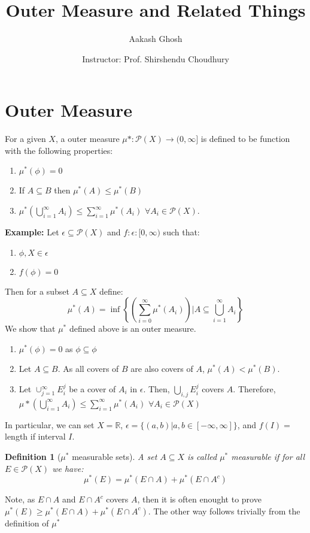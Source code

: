 \documentclass[oneside]{article}
\title{Outer Measure and Related Things}
\author{Aakash Ghosh }
\date{Instructor: Prof. Shirshendu Choudhury}
\newtheorem{definition}[theorem]{Definition}
\begin{document}
\maketitle





\section{Outer Measure}
For a given $X$, a outer measure $\mu *: \mathcal{P}(X)\to(0,\infty]$ is defined to be function with the following properties:
\begin{enumerate}
    \item $\mu^* (\phi)=0$
    \item If $A\subseteq B$ then $\mu^*(A)\leq \mu^*(B)$
    \item $\mu^*\left(\bigcup_{i=1}^\infty A_i\right)\leq \sum_{i=1}^\infty \mu^*(A_i)$ $\forall A_i\in\mathcal{P}(X)$.
\end{enumerate}

\textbf{Example:} Let $\epsilon\subseteq\mathcal P(X)$ and $f:\epsilon:[0,\infty)$ such that:
\begin{enumerate}
    \item $\phi,X\in \epsilon$
    \item $f(\phi)=0$
\end{enumerate}
Then for a subset $A\subseteq X$ define: 
$$\mu^*(A)=\inf\left\{\left(\sum_{i=0}^\infty\mu^*(A_i)\right)|A\subseteq \bigcup_{i=1}^\infty A_i\right\}$$
We show that $\mu^*$ defined above is an outer measure.
\begin{enumerate}
    \item $\mu^*(\phi)=0$ as $\phi\subseteq\phi$
    \item Let $A\subseteq B$. As all covers of $B$ are also covers of $A$, $\mu^*(A)<\mu^*(B)$.
    \item Let $\cup_{j=1}^\infty E_i^j$ be a cover of $A_i$ in $\epsilon$. Then, $\bigcup_{i,j}E_i^j$ covers $A$. Therefore,  $\mu *\left(\bigcup_{i=1}^\infty A_i\right)\leq \sum_{i=1}^\infty \mu^*(A_i)$ $\forall A_i\in\mathcal{P}(X)$
\end{enumerate}
In particular, we can set $X=\mathbb{R}$, $\epsilon=\{(a,b)|a,b\in[-\infty,\infty]\}$, and $f(I)=$ length if interval $I$. 
\begin{definition}[$\mu^*$ measurable sets]
    A set $A\subseteq X$ is called $\mu^*$ measurable if for all $E\in\mathcal{P}(X)$ we have:
    $$\mu^*(E)=\mu^*(E\cap A)+\mu^*(E\cap A^c)$$    
\end{definition}
Note, as $E\cap A$ and $E\cap A^c$ covers $A$, then it is often enought to prove $\mu^*(E)\geq\mu^*(E\cap A)+\mu^*(E\cap A^c)$. The other way follows trivially from the definition of $\mu^*$
\end{document}
